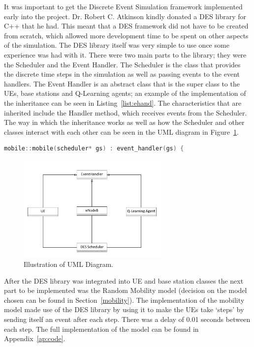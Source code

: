 It was important to get the Discrete Event Simulation framework implemented early into the project. Dr. Robert C. Atkinson kindly donated a DES library for C++ that he had. This meant that a DES framework did not have to be created from scratch, which allowed more development time to be spent on other aspects of the simulation. The DES library itself was very simple to use once some experience was had with it. There were two main parts to the library; they were the Scheduler and the Event Handler. The Scheduler is the class that provides the discrete time steps in the simulation as well as passing events to the event handlers. The Event Handler is an abstract class that is the super class to the UEs, base stations and Q-Learning agents; an example of the implementation of the inheritance can be seen in Listing~\ref{list:ehand}. The characteristics that are inherited include the Handler method, which receives events from the Scheduler. The way in which the inheritance works as well as how the Scheduler and other classes interact with each other can be seen in the UML diagram in Figure~\ref{fig:uml}. 
\begin{lstlisting}[language=c++, caption=Implementation of inheritance from Event Handler., label=list:ehand]
mobile::mobile(scheduler* gs) : event_handler(gs) {
\end{lstlisting}
\begin{figure}[H]
  \begin{center}
    	  \includegraphics[width=0.66\textwidth]{figures/simulation/uml.pdf}
    \end{center}
    \caption{Illustration of UML Diagram.}
    \label{fig:uml}
\end{figure}
After the DES library was integrated into UE and base station classes the next part to be implemented was the Random Mobility model (decision on the model chosen can be found in Section~\ref{mobility}). The implementation of the mobility model made use of the DES library by using it to make the UEs take `steps' by sending itself an event after each step. There was a delay of 0.01 seconds between each step. The full implementation of the model can be found in Appendix~\ref{ap:code}. 


